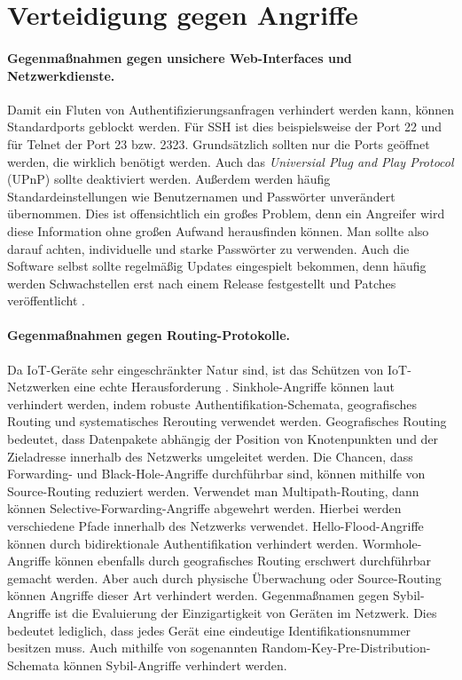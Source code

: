 \section{Verteidigung gegen Angriffe}\label{sec:defense-against-attacks}

\paragraph{Gegenmaßnahmen gegen unsichere Web-Interfaces und Netzwerkdienste.}
Damit ein Fluten von Authentifizierungsanfragen verhindert werden kann, können
Standardports geblockt werden. Für SSH ist dies beispielsweise der Port 22 und
für Telnet der Port 23 bzw. 2323. Grundsätzlich sollten nur die Ports geöffnet
werden, die wirklich benötigt werden. Auch das \textit{Universial Plug and Play
Protocol} (UPnP) sollte deaktiviert werden. Außerdem werden häufig
Standardeinstellungen wie Benutzernamen und Passwörter unverändert übernommen.
Dies ist offensichtlich ein großes Problem, denn ein Angreifer wird diese
Information ohne großen Aufwand herausfinden können. Man sollte also darauf
achten, individuelle und starke Passwörter zu verwenden. Auch die Software
selbst sollte regelmäßig Updates eingespielt bekommen, denn häufig werden
Schwachstellen erst nach einem Release festgestellt und Patches veröffentlicht
\cite{paper}.

\paragraph{Gegenmaßnahmen gegen Routing-Protokolle.}
Da IoT-Geräte sehr eingeschränkter Natur sind, ist das Schützen von
IoT-Netzwerken eine echte Herausforderung \cite{patel2016}. Sinkhole-Angriffe
können laut \cite{paper} verhindert werden, indem robuste
Authentifikation-Schemata, geografisches Routing und systematisches Rerouting
verwendet werden.  Geografisches Routing bedeutet, dass Datenpakete abhängig der
Position von Knotenpunkten und der Zieladresse innerhalb des Netzwerks
umgeleitet werden.  Die Chancen, dass Forwarding- und Black-Hole-Angriffe
durchführbar sind, können mithilfe von Source-Routing reduziert werden.
Verwendet man Multipath-Routing, dann können Selective-Forwarding-Angriffe
abgewehrt werden. Hierbei werden verschiedene Pfade innerhalb des Netzwerks
verwendet. Hello-Flood-Angriffe können durch bidirektionale Authentifikation
verhindert werden.  Wormhole-Angriffe können ebenfalls durch geografisches
Routing erschwert durchführbar gemacht werden. Aber auch durch physische
Überwachung oder Source-Rou\-ting können Angriffe dieser Art verhindert werden.
Gegenmaßnamen gegen Sybil-Angriffe ist die Evaluierung der Einzigartigkeit von
Geräten im Netzwerk.  Dies bedeutet lediglich, dass jedes Gerät eine eindeutige
Identifikationsnummer besitzen muss. Auch mithilfe von sogenannten
Random-Key-Pre-Dis\-tri\-bu\-tion-Schemata \cite{chan2003} können Sybil-Angriffe
verhindert werden.

